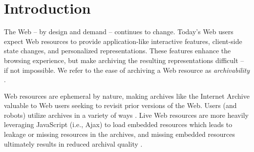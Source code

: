 \documentclass{ipres_proc_article-sp}
\begin{document}


\section{Introduction}
\label{introduction}
The Web -- by design and demand -- continues to change. Today's Web users expect Web resources to provide application-like interactive features, client-side state changes, and personalized representations. These features enhance the browsing experience, but make archiving the resulting representations difficult -- if not impossible. We refer to the ease of archiving a Web resource as \emph{archivability} \cite{ijdl}. 


Web resources are ephemeral by nature, making archives like the Internet Archive \cite{iawebarchive, waybackarchives2} valuable to Web users seeking to revisit prior versions of the Web. Users (and robots) utilize archives in a variety of ways \cite{usingIA, marshalls_social_media_study, yasminLinks}. Live Web resources are more heavily leveraging JavaScript (i.e., Ajax) to load embedded resources which leads to leakage \cite{zombies} or missing resources in the archives, and missing embedded resources ultimately results in reduced archival quality \cite{brunelleDamage}.
\end{document}
